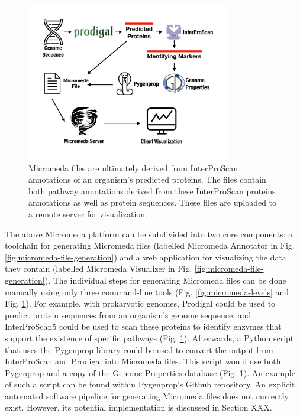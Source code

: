 \begin{figure}[!ht]
  \centering
	\includegraphics[width=0.8\textwidth]{media/how-micromeda-files-are-built.pdf}
	 \caption{Micromeda files are ultimately derived from InterProScan annotations of an organism's predicted proteins. The files contain both pathway annotations derived from these InterProScan proteins annotations as well as protein sequences. These files are uploaded to a remote server for visualization.}
	 \label{fig:micromeda-file-building-and-use}
\end{figure}

The above Micromeda platform can be subdivided into two core components: a toolchain for generating Micromeda files (labelled Micromeda Annotator in Fig. \ref{fig:micromeda-file-generation}) and a web application for visualizing the data they contain (labelled Micromeda Visualizer in Fig. \ref{fig:micromeda-file-generation}). The individual steps for generating Micromeda files can be done manually using only three command-line tools (Fig. \ref{fig:micromeda-levels} and Fig. \ref{fig:micromeda-file-building-and-use}). For example, with prokaryotic genomes, Prodigal could be used to predict protein sequences from an organism's genome sequence, and InterProScan5 could be used to scan these proteins to identify enzymes that support the existence of specific pathways (Fig. \ref{fig:micromeda-file-building-and-use}). Afterwards, a Python script that uses the Pygenprop library could be used to convert the output from InterProScan and Prodigal into Micromeda files. This script would use both Pygenprop and a copy of the Genome Properties database (Fig. \ref{fig:micromeda-file-building-and-use}). An example of such a script can be found within Pygenprop's Github repository. An explicit automated software pipeline for generating Micromeda files does not currently exist. However, its potential implementation is discussed in Section XXX.

